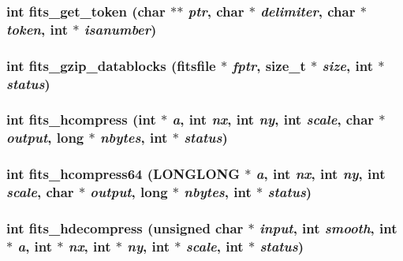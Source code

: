 \subsubsection{\setlength{\rightskip}{0pt plus 5cm}int fits\_\-get\_\-token (char $\ast$$\ast$ {\em ptr}, char $\ast$ {\em delimiter}, char $\ast$ {\em token}, int $\ast$ {\em isanumber})}\label{fitsio__64_8h_ca9b90d253500bbaedc01bf68a237bbc}


\subsubsection{\setlength{\rightskip}{0pt plus 5cm}int fits\_\-gzip\_\-datablocks (\bf{fitsfile} $\ast$ {\em fptr}, size\_\-t $\ast$ {\em size}, int $\ast$ {\em status})}\label{fitsio__64_8h_d3833db62771131406d2efc3bcaac608}


\subsubsection{\setlength{\rightskip}{0pt plus 5cm}int fits\_\-hcompress (int $\ast$ {\em a}, int {\em nx}, int {\em ny}, int {\em scale}, char $\ast$ {\em output}, long $\ast$ {\em nbytes}, int $\ast$ {\em status})}\label{fitsio__64_8h_9d65ebdca580c566c8c94d1e1356abb4}


\subsubsection{\setlength{\rightskip}{0pt plus 5cm}int fits\_\-hcompress64 (\bf{LONGLONG} $\ast$ {\em a}, int {\em nx}, int {\em ny}, int {\em scale}, char $\ast$ {\em output}, long $\ast$ {\em nbytes}, int $\ast$ {\em status})}\label{fitsio__64_8h_6a8c7a3b62ae7c4528dc04366c28309b}


\subsubsection{\setlength{\rightskip}{0pt plus 5cm}int fits\_\-hdecompress (unsigned char $\ast$ {\em input}, int {\em smooth}, int $\ast$ {\em a}, int $\ast$ {\em nx}, int $\ast$ {\em ny}, int $\ast$ {\em scale}, int $\ast$ {\em status})}\label{fitsio__64_8h_1f0bd67aa23a45cf824d7a4681ce71d4}


